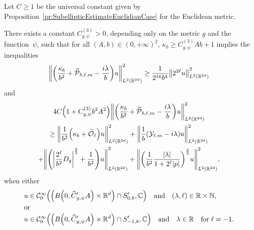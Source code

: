 \documentclass[AHL,Unicode,longabstracts]{cedram}
\newcommand{\C}{\mathbb{C}}
\newcommand{\R}{\mathbb{R}}
\newcommand{\N}{\mathbb{N}}
\newcommand{\clC}{\mathcal{C}}
\newcommand{\clY}{\mathcal{Y}}
\newcommand{\clO}{\mathcal{O}}
\newcommand{\clP}{\mathcal{P}}
\let\oldtilde\tilde
\renewcommand*{\tilde}[1]{\mathchoice{\widetilde{#1}}{\widetilde{#1}}{\oldtilde{#1}}{\oldtilde{#1}}}
\let\oldhat\hat
\renewcommand*{\hat}[1]{\mathchoice{\widehat{#1}}{\widehat{#1}}{\oldhat{#1}}{\oldhat{#1}}}
\let\originalleft\left
\let\originalright\right
\renewcommand{\left}{\mathopen{}\mathclose\bgroup\originalleft}
\renewcommand{\right}{\aftergroup\egroup\originalright}
\begin{document}
\begin{prop}\label{pr:LowerBoundInLocalizedGeneralCase}
Let $C\geq 1$ be the universal constant given by Proposition~\ref{pr:SubellipticEstimateEuclidianCase} for the Euclidean metric.

There exists a constant $C_{g,\psi}^{(3)}>0$, depending only on the metric $g$ and the function~$\psi$, such that for all $(A,b)\in (0,+\infty)^2$, $\kappa_b \geq C_{g,\psi}^{(3)}Ab+1$ implies the inequalities
\begin{equation}\label{pr:LowerBoundInLocalizedGeneralCaseIPP}
\left\| \left(\frac{\kappa_{b}}{b^{2}} + \tilde{\clP}_{b,\ell,m} - \frac{i\lambda}{b} \right) u \right\|_{L^2(\R^{2d})}^{2} \geq \frac{1}{2^{16}b^4}\left\|2^{2\ell} u\right\|_{L^2(\R^{2d})}^2
\end{equation}
and
\begin{multline}\label{eq:subellipticEstimateInAlmostEuclideanCase}
4C\left(1 + C_{g,\psi}^{(3)}b^2A^2\right)\left\| \left(\frac{\kappa_{b}}{b^{2}} + \tilde{\clP}_{b,\ell,m} - \frac{i\lambda}{b} \right) u \right\|_{L^2(\R^{2d})}^{2}\\
\geq \left\| \frac{1}{b^2}\left(\kappa_b+\tilde{\clO}_{\ell}\right) u\right\|_{L^2(\R^{2d})}^2 + \left\| \frac{1}{b}\left(\clY_{\ell,m}-i \lambda \right)u \right\|_{L^2(\R^{2d})}^2
\\ + \left\| \left(\left|\frac{2^{\ell}}{b^2}D_{q} \right|^{\frac{2}{3}} + \frac{1}{b^2}\right) u \right\|_{L^2(\R^{2d})}^{2} + \left\| \left(\frac{1}{b^2} \frac{|\lambda|}{1+2^{\ell}|p|} \right)^{\frac{2}{3}} u \right\|_{L^2(\R^{2d})}^{2} ,
\end{multline}
when either
\begin{align*}
u &\in \clC^\infty_0\left(\left(B\left(0,\hat{C}'_{g,\psi}A\right)\times \R^d\right)\cap S_{0,8}',\C\right)\quad\text{and}\quad (\lambda,\ell)\in \R\times \N,\\
\intertext{or}
u &\in \clC^\infty_0\left(\left(B\left(0,\hat{C}'_{g,\psi}A\right)\times \R^d\right)\cap S_{-1,8}',\C\right)\quad \text{and}\quad \lambda\in \R\quad\text{for}\; \ell=-1.
\end{align*}
\end{prop}
\end{document}

